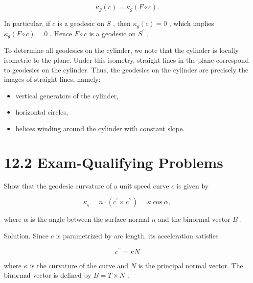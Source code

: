 \documentclass[10pt]{article}
\begin{document}
\[
{\kappa }_{g}\left( c\right)  = {\kappa }_{g}\left( {F \circ  c}\right) .
\]

In particular, if \(c\) is a geodesic on \(S\) , then \({\kappa }_{g}\left( c\right)  = 0\) , which implies \({\kappa }_{g}\left( {F \circ  c}\right)  = 0\) . Hence \(F \circ  c\) is a geodesic on \({S}^{\prime }\) .

To determine all geodesics on the cylinder, we note that the cylinder is locally isometric to the plane. Under this isometry, straight lines in the plane correspond to geodesics on the cylinder. Thus, the geodesics on the cylinder are precisely the images of straight lines, namely:

\begin{itemize}\relax
\item\relax vertical generators of the cylinder,
\end{itemize}

\begin{itemize}\relax
\item\relax horizontal circles,
\end{itemize}

\begin{itemize}\relax
\item\relax helices winding around the cylinder with constant slope.
\end{itemize}

\section*{12.2 Exam-Qualifying Problems}

\begin{problem}[title=PROBLEM 4 (4 POINTS)]
Show that the geodesic curvature of a unit speed curve \(c\) is given by

\[
{\kappa }_{g} = n \cdot  \left( {{c}^{\prime } \times  {c}^{\prime \prime }}\right)  = \kappa \cos \alpha ,
\]

where \(\alpha\) is the angle between the surface normal \(n\) and the binormal vector \(B\) .
\end{problem}

Solution. Since \(c\) is parametrized by arc length, its acceleration satisfies

\[
{c}^{\prime \prime } = {\kappa N}
\]

where \(\kappa\) is the curvature of the curve and \(N\) is the principal normal vector. The binormal vector is defined by \(B = T \times  N\) .
\end{document}
